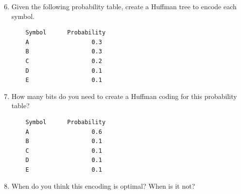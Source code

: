 \documentclass[11pt]{article}
\begin{document}
\begin{enumerate}\setcounter{enumi}{5}
	\item Given the following probability table, create a Huffman tree to encode each symbol.
	\begin{verbatim}
	Symbol		Probability
	A		   		   0.3
	B		   		   0.3
	C		   		   0.2
	D		   		   0.1
	E		   		   0.1
	\end{verbatim}
\item How many bits do you need to create a Huffman coding for this probability table?
	\begin{verbatim}
	Symbol		Probability
	A		   		   0.6
	B		   		   0.1
	C		   		   0.1
	D		   		   0.1
	E		   		   0.1
\end{verbatim}


\item When do you think this encoding is optimal? When is it not?
\end{enumerate}
\end{document}

